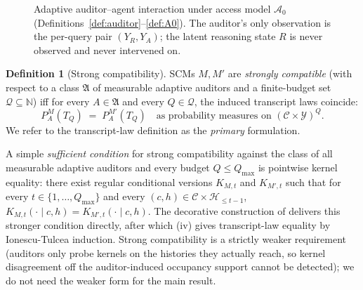 \documentclass{article}
\theoremstyle{plain}
\theoremstyle{definition}
\newtheorem{definition}[theorem]{Definition}
\theoremstyle{remark}
\newcommand{\C}{\mathcal{C}}
\newcommand{\Y}{\mathcal{Y}}
\newcommand{\Hist}{\mathcal{H}}
\begin{document}
\begin{figure}[ht]
\centering
{}
\caption{Adaptive auditor--agent interaction under access model $\mathcal{A}_0$
(Definitions~\ref{def:auditor}--\ref{def:A0}). The auditor's only observation is
the per-query pair $(Y_R, Y_A)$; the latent reasoning state $R$ is never
observed and never intervened on.}
\label{fig:auditor-loop}
\end{figure}

\begin{definition}[Strong compatibility]\label{def:compat}
SCMs $M, M'$ are \emph{strongly compatible} (with respect to a class
$\mathfrak{A}$ of measurable adaptive auditors and a finite-budget set
$\mathcal Q \subseteq \mathbb N$) iff for every $A \in \mathfrak{A}$ and
every $Q \in \mathcal Q$, the induced transcript laws coincide:
\[
P_A^M(T_Q) \;=\; P_A^{M'}(T_Q) \quad \text{as probability measures on } (\C \times \Y)^Q.
\]
We refer to the transcript-law definition as the \emph{primary} formulation.

\smallskip
A simple \emph{sufficient condition} for strong compatibility against the
class of all measurable adaptive auditors and every budget $Q \le Q_{\max}$
is pointwise kernel equality: there exist regular conditional versions
$K_{M,t}$ and $K_{M',t}$ such that for every
$t \in \{1, \ldots, Q_{\max}\}$ and every
$(c, h) \in \C \times \Hist_{\le t-1}$,
$K_{M,t}(\cdot \mid c, h) = K_{M',t}(\cdot \mid c, h)$. The decorative
construction of  delivers this stronger condition
directly, after which (iv) gives transcript-law
equality by Ionescu-Tulcea induction. Strong compatibility is a strictly
weaker requirement (auditors only probe kernels on the histories they
actually reach, so kernel disagreement off the auditor-induced occupancy
support cannot be detected); we do not need the weaker form for the main
result.
\end{definition}
\end{document}
